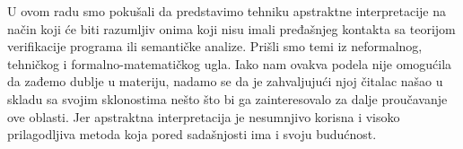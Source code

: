 U ovom radu smo pokušali da predstavimo tehniku apstraktne interpretacije na način koji će biti razumljiv onima koji nisu imali pređašnjeg kontakta sa teorijom verifikacije programa ili semantičke analize. Prišli smo temi iz neformalnog, tehničkog i formalno-matematičkog ugla. Iako nam ovakva podela nije omogućila da zađemo dublje u materiju, nadamo se da je zahvaljujući njoj čitalac našao u skladu sa svojim sklonostima nešto što bi ga zainteresovalo za dalje proučavanje ove oblasti. Jer apstraktna interpretacija je nesumnjivo korisna i visoko prilagodljiva metoda koja pored sadašnjosti ima i svoju budućnost.